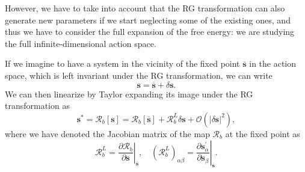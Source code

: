 However, we have to take into account that the RG transformation can also generate new parameters if we start neglecting some of the existing ones, and thus we have to consider the full expansion of the free energy: we are studying the full infinite-dimensional action space.

If we imagine to have a system in the vicinity of the fixed point \(\overline{\mathbf{s}}\) in the action space, which is left invariant under the RG transformation, we can write
\[
    \mathbf{s} = \overline{\mathbf{s}} + \delta \mathbf{s}.
\]
We can then linearize by Taylor expanding its image under the RG transformation as
\[
    \mathbf{s}^* = \mathcal{R}_b[\mathbf{s}] = \mathcal{R}_b[\overline{\mathbf{s}}] + \mathcal{R}_b^L \delta \mathbf{s} + \mathcal{O} (\vert \delta \mathbf{s} \vert^2 ),
\]
where we have denoted the Jacobian matrix of the map \(\mathcal{R}_b\) at the fixed point as
\[
    \mathcal{R}_b^L = \left. \frac{\partial \mathcal{R}_b}{\partial \mathbf{s}} \right|_{\overline{\mathbf{s}}}, \quad (\mathcal{R}_b^L)_{\alpha \beta} = \left. \frac{\partial \mathbf{s}^{\prime}_{\alpha}}{\partial \mathbf{s}_{\beta}} \right|_{\overline{\mathbf{s}}}.
\]

